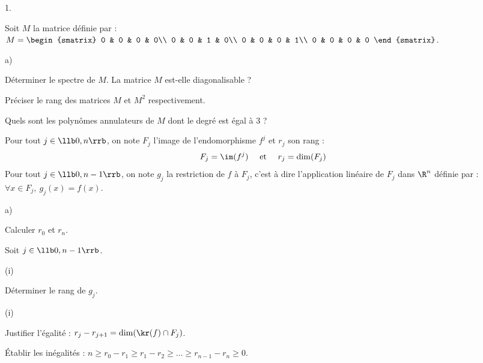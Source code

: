 \documentclass[11pt]{article}%
\begin{document}
\begin{noliste}{1.}
  \setlength{\itemsep}{4mm}
  \item Soit $M$ la matrice définie par : 
  $M = \begin{smatrix}
    0 & 0 & 0 & 0\\
    0 & 0 & 1 & 0\\
    0 & 0 & 0 & 1\\
    0 & 0 & 0 & 0
  \end{smatrix}$.
  \begin{noliste}{a)}
    \setlength{\itemsep}{2mm}
    \item Déterminer le spectre de $M$. La matrice $M$ est-elle 
    diagonalisable ?
    
    

    
    \item Préciser le rang des matrices $M$ et $M^2$ respectivement.
    
    

    
    \item Quels sont les polynômes annulateurs de $M$ dont le degré 
    est égal à $3$ ? 
    
    
  \end{noliste}
  
  
  
  
\item Pour tout $j \in \llb 0,n \rrb$, on note $F_j$ l'image de
  l'endomorphisme $f^j$ et $r_j$ son rang : 
  \[
  F_j = \im(f^j) \quad \text{ et } \quad r_j = \dim(F_j)
  \]
  Pour tout $j \in \llb 0, n-1 \rrb$, on note $g_j$ la restriction de
  $f$ à $F_j$, c'est à dire l'application linéaire de $F_j$ dans
  $\R^n$ définie par : $\forall x \in F_j, \ g_j(x)=f(x)$.
  \begin{noliste}{a)}
    \setlength{\itemsep}{2mm}
    \item Calculer $r_0$ et $r_n$.
    
    

    
    \item Soit $j \in \llb 0,n-1\rrb$.
    \begin{nonoliste}{(i)}
      \item Déterminer le rang de $g_j$.
    \end{nonoliste}

    
    
%       

    \begin{nonoliste}{(i)}
      \setcounter{enumiii}{1}
    \item Justifier l'égalité : $r_j-r_{j+1}=\dim(\kr(f) \cap F_j)$.
      
      
    \end{nonoliste}
    



  \item Établir les inégalités : $n \geq r_0-r_1 \geq r_1-r_2 \geq
    \ldots \geq r_{n-1}-r_n \geq 0$.
    
    
  \end{noliste}
\end{noliste}
\end{document}
